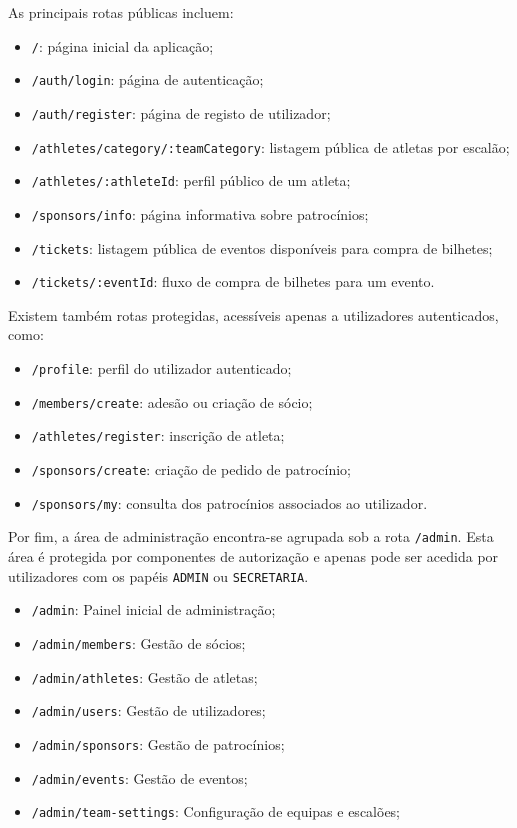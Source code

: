 As principais rotas públicas incluem:

\begin{itemize}
    \item \texttt{/}: página inicial da aplicação;
    \item \texttt{/auth/login}: página de autenticação;
    \item \texttt{/auth/register}: página de registo de utilizador;
    \item \texttt{/athletes/category/:teamCategory}: listagem pública de atletas
    por escalão;
    \item \texttt{/athletes/:athleteId}: perfil público de um atleta;
    \item \texttt{/sponsors/info}: página informativa sobre patrocínios;
    \item \texttt{/tickets}: listagem pública de eventos disponíveis para compra
    de bilhetes;
    \item \texttt{/tickets/:eventId}: fluxo de compra de bilhetes para um evento.
\end{itemize}

Existem também rotas protegidas, acessíveis apenas a utilizadores autenticados,
como:

\begin{itemize}
    \item \texttt{/profile}: perfil do utilizador autenticado;
    \item \texttt{/members/create}: adesão ou criação de sócio;
    \item \texttt{/athletes/register}: inscrição de atleta;
    \item \texttt{/sponsors/create}: criação de pedido de patrocínio;
    \item \texttt{/sponsors/my}: consulta dos patrocínios associados ao
    utilizador.
\end{itemize}

Por fim, a área de administração encontra-se agrupada sob a rota
\texttt{/admin}. Esta área é protegida por componentes de autorização e apenas
pode ser acedida por utilizadores com os papéis \texttt{ADMIN} ou
\texttt{SECRETARIA}.

\begin{itemize}
    \item \texttt{/admin}: Painel inicial de administração;
    \item \texttt{/admin/members}: Gestão de sócios;
    \item \texttt{/admin/athletes}: Gestão de atletas;
    \item \texttt{/admin/users}: Gestão de utilizadores;
    \item \texttt{/admin/sponsors}: Gestão de patrocínios;
    \item \texttt{/admin/events}: Gestão de eventos;
    \item \texttt{/admin/team-settings}: Configuração de equipas e escalões;
\end{itemize}

